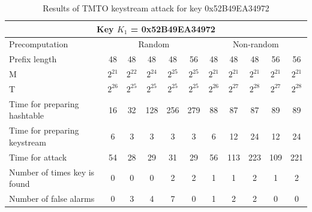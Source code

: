 \begin{table}[ht!]
\begin{center}
\begin{tabular}{|p{3cm}||c|c|c|c|c|c|c|c|c|c|}
\hline
\multicolumn{11}{|c|}{\textbf{Key $K_1$ = 0x52B49EA34972}} \\ \hline \hline
Precomputation 	& \multicolumn{5}{c|}{Random} & \multicolumn{5}{c|}{Non-random} \\ \hline
Prefix length										&	48 				&	48 				&	48 				&	48 				& 56 				&	48 				&	48				&	48 				&	56 				&	56  			\\ \hline
M																&	$2^{21}$ 	&	$2^{22}$ 	&	$2^{24}$ 	&	$2^{25}$ 	&	$2^{25}$ 	& $2^{21}$ 	&	$2^{21}$ 	&	$2^{21}$ 	&	$2^{21}$ 	& $2^{21}$	\\ \hline
T	  														&	$2^{26}$ 	&	$2^{25}$ 	&	$2^{25}$ 	&	$2^{25}$	&	$2^{25}$ 	& $2^{26}$ 	&	$2^{27}$ 	&	$2^{28}$ 	& $2^{27}$ 	& $2^{28}$	\\ \hline
Time for preparing hashtable		&	16 				&	32 				&	128				&	256				&	279 			& 88 				&	87				& 87				&	89	 			& 89				\\ \hline
Time for preparing keystream		&	6 				&	3 				&	3 				&	3 				&	3 				& 6 				&	12				& 24				&	12				& 24				\\ \hline
Time for attack									&	54 				&	28 				&	29 				&	31 				&	29 				& 56 				&	113				& 223				&	109				& 221				\\ \hline
Number of times key is found		&	0 				&	0 				&	0 				&	2 				&	2 				& 1 				&	1					& 2 				&	1 				& 2					\\ \hline
Number of false alarms					&	0 				&	3 				&	4 				&	7 				&	0 				& 1  				&	2					& 2 				& 0 				& 0					\\ \hline
\end{tabular}
\end{center}
\caption{Results of TMTO keystream attack for key 0x52B49EA34972}
\label{tab:keystream-attack-results-key1}
\end{table}


